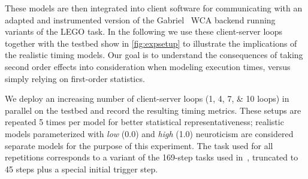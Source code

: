 These models are then integrated into client software for communicating with an adapted and instrumented version of the Gabriel~\cite{Chen2015LEGO,Chen2018application} \ac{WCA} backend running variants of the LEGO task.
In the following we use these client-server loops together with the testbed show in \cref{fig:expsetup} to illustrate the implications of the realistic timing models.
Our goal is to understand the consequences of taking second order effects into consideration when modeling execution times, versus simply relying on first-order statistics.


We deploy an increasing number of client-server loops (\numlist{1;4;7;10} loops) in parallel on the testbed and record the resulting timing metrics.
These setups are repeated \num{5} times per model for better statistical representativeness; realistic models parameterized with \emph{low} (\num{0.0}) and \emph{high} (\num{1.0}) neuroticism are considered separate models for the purpose of this experiment.
The task used for all repetitions corresponds to a variant of the \num{169}-step tasks used in~\cite{olguinmunoz:impact2021}, truncated to \num{45} steps plus a special initial trigger step. 

\medskip

